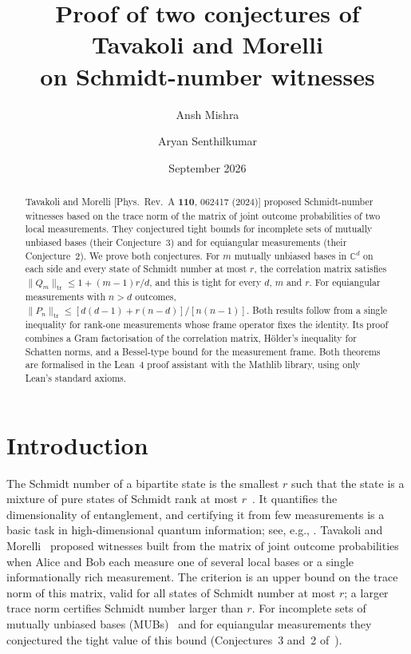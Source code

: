 \documentclass[11pt]{amsart}
\theoremstyle{definition}
\theoremstyle{remark}
\newcommand{\C}{\mathbb{C}}
\newcommand{\tr}{\mathrm{tr}}
\begin{document}
\title[Tavakoli--Morelli Schmidt-number conjectures]{Proof of two conjectures of Tavakoli and Morelli\\ on Schmidt-number witnesses}

\author{Ansh Mishra}
\author{Aryan Senthilkumar}

\date{September 2026}

\begin{abstract}
Tavakoli and Morelli [Phys.\ Rev.\ A \textbf{110}, 062417 (2024)] proposed Schmidt-number witnesses based on the
trace norm of the matrix of joint outcome probabilities of two local measurements. They conjectured tight bounds
for incomplete sets of mutually unbiased bases (their Conjecture~3) and for equiangular measurements (their
Conjecture~2). We prove both conjectures. For $m$ mutually unbiased bases in $\C^d$ on each side and every state
of Schmidt number at most $r$, the correlation matrix satisfies $\|Q_m\|_{\tr}\le 1+(m-1)r/d$, and this is tight
for every $d$, $m$ and $r$. For equiangular measurements with $n>d$ outcomes,
$\|P_n\|_{\tr}\le[d(d-1)+r(n-d)]/[n(n-1)]$. Both results follow from a single inequality for rank-one
measurements whose frame operator fixes the identity. Its proof combines a Gram factorisation of the correlation
matrix, H\"older's inequality for Schatten norms, and a Bessel-type bound for the measurement frame. Both theorems
are formalised in the Lean~4 proof assistant with the Mathlib library, using only Lean's standard axioms.
\end{abstract}

\maketitle

\section{Introduction}

The Schmidt number of a bipartite state is the smallest $r$ such that the state is a mixture of pure states of
Schmidt rank at most $r$~\cite{TerhalHorodecki2000}. It quantifies the dimensionality of entanglement, and
certifying it from few measurements is a basic task in high-dimensional quantum information; see, e.g.,
\cite{Spengler2012,Bavaresco2018}. Tavakoli and Morelli~\cite{TavakoliMorelli2024} proposed witnesses built from
the matrix of joint outcome probabilities when Alice and Bob each measure one of several local bases or a single
informationally rich measurement. The criterion is an upper bound on the trace norm of this matrix, valid for all
states of Schmidt number at most $r$; a larger trace norm certifies Schmidt number larger than $r$. For
incomplete sets of mutually unbiased bases (MUBs)~\cite{WoottersFields1989,Durt2010} and for equiangular
measurements they conjectured the tight value of this bound (Conjectures~3 and~2 of~\cite{TavakoliMorelli2024}).
\end{document}
